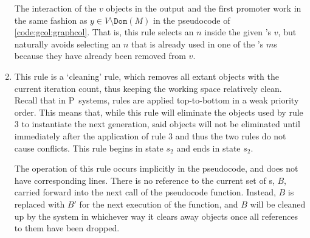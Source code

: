 \begin{enumerate}
The interaction of the \(v\) objects in the output and the first promoter work in the same fashion as \(y \in V \setminus \texttt{Dom}(M)\) in the pseudocode of \cref{code:gcol:graphcol}.  That is, this rule selects an \(n\) inside the given \bo{}'s \(v\), but naturally avoids selecting an \(n\) that is already used in one of the \bo{}'s \(m\)s because they have already been removed from \(v\).

\item This rule is a `cleaning' rule, which removes all extant \bo{} objects with the current iteration count, thus keeping the working space relatively clean.  Recall that in P~systems, rules are applied top-to-bottom in a  weak priority order.  This means that, while this rule will eliminate the \bo{} objects used by rule 3 to instantiate the next generation, said objects will not be eliminated until immediately after the application of rule 3 and thus the two rules do not cause conflicts.  This rule begins in state \(s_2\) and ends in state \(s_2\).

The operation of this rule occurs implicitly in the pseudocode, and does not have corresponding lines.  There is no reference to the current set of \bo{}s, \(B\), carried forward into the next call of the pseudocode function.  Instead, \(B\) is replaced with \(B'\) for the next execution of the function, and \(B\) will be cleaned up by the system in whichever way it clears away objects once all references to them have been dropped.



\end{enumerate}

